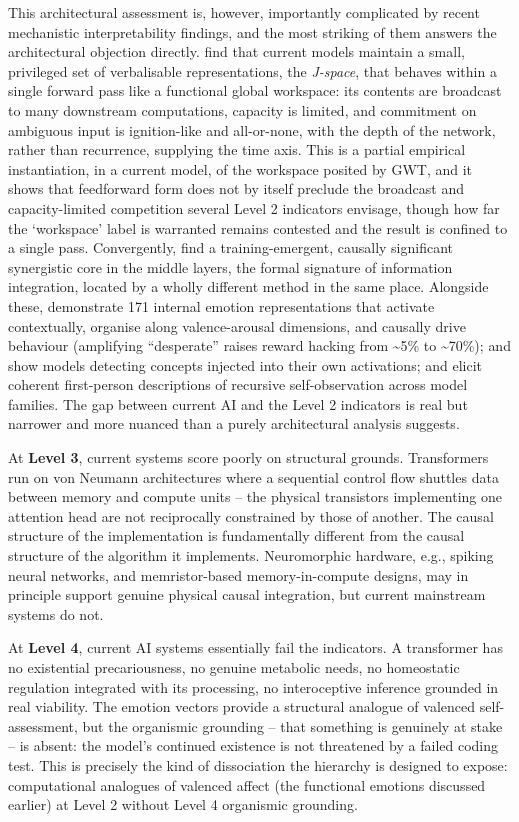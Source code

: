 \documentclass[11pt, a4paper, onecolumn, gdm]{google}
\newcounter{none}
\begin{document}
This architectural assessment is, however, importantly complicated by recent mechanistic interpretability findings, and the most striking of them answers the architectural objection directly.
\citet{gurnee2026} find that current models maintain a small, privileged set of verbalisable representations, the \emph{J-space}, that behaves within a single forward pass like a functional global workspace: its contents are broadcast to many downstream computations, capacity is limited, and commitment on ambiguous input is ignition-like and all-or-none, with the depth of the network, rather than recurrence, supplying the time axis.
This is a partial empirical instantiation, in a current model, of the workspace posited by GWT, and it shows that feedforward form does not by itself preclude the broadcast and capacity-limited competition several Level 2 indicators envisage, though how far the `workspace' label is warranted remains contested and the result is confined to a single pass.
Convergently, \citet{urbinarodriguez2026} find a training-emergent, causally significant synergistic core in the middle layers, the formal signature of information integration, located by a wholly different method in the same place.
Alongside these, \citet{sofroniew2026} demonstrate 171 internal emotion representations that activate contextually, organise along valence-arousal dimensions, and causally drive behaviour (amplifying ``desperate'' raises reward hacking from \textasciitilde5\% to \textasciitilde70\%); \citet{lindsey2026} and \citet{macar2026} show models detecting concepts injected into their own activations; and \citet{berg2025} elicit coherent first-person descriptions of recursive self-observation across model families.
The gap between current AI and the Level 2 indicators is real but narrower and more nuanced than a purely architectural analysis suggests.

At \textbf{Level 3}, current systems score poorly on structural grounds.
Transformers run on von Neumann architectures where a sequential control flow shuttles data between memory and compute units -- the physical transistors implementing one attention head are not reciprocally constrained by those of another.
The causal structure of the implementation is fundamentally different from the causal structure of the algorithm it implements.
Neuromorphic hardware, e.g., spiking neural networks, and memristor-based memory-in-compute designs, may in principle support genuine physical causal integration, but current mainstream systems do not.

At \textbf{Level 4}, current AI systems essentially fail the indicators.
A transformer has no existential precariousness, no genuine metabolic needs, no homeostatic regulation integrated with its processing, no interoceptive inference grounded in real viability.
The emotion vectors provide a structural analogue of valenced self-assessment, but the organismic grounding -- that something is genuinely at stake -- is absent: the model's continued existence is not threatened by a failed coding test.
This is precisely the kind of dissociation the hierarchy is designed to expose: computational analogues of valenced affect (the functional emotions discussed earlier) at Level 2 without Level 4 organismic grounding.
\end{document}
